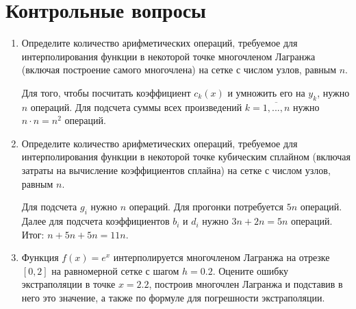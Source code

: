 \documentclass[12pt, a4paper]{article}
\begin{document}
\pagebreak

\section{Контрольные вопросы}
\begin{enumerate}

\item Определите количество арифметических операций, требуемое для интерполирования функции в некоторой точке многочленом Лагранжа (включая построение самого многочлена) на сетке с числом узлов, равным $n$.

Для того, чтобы посчитать коэффициент $c_k(x)$ и умножить его на $y_k$, нужно $n$ операций. Для подсчета суммы всех произведений $k = \overline{1,..., n}$ нужно $n \cdot n = n^2$ операций.

\item Определите количество арифметических операций, требуемое для интерполирования функции в некоторой точке кубическим сплайном (включая затраты на вычисление коэффициентов сплайна) на сетке с числом узлов, равным $n$.

Для подсчета $g_i$ нужно $n$ операций. Для прогонки потребуется $5n$ операций. Далее для подсчета коэффициентов $b_i$ и $d_i$ нужно $3n + 2n = 5n$ операций. Итог: $n + 5n + 5n = 11n$.

\pagebreak

\item Функция $f(x) = e^x$ интерполируется многочленом Лагранжа на отрезке $[0, 2]$ на равномерной сетке с шагом $h = 0{.}2$. Оцените ошибку экстраполяции в точке $x = 2{.}2$, построив многочлен Лагранжа и подставив в него это значение, а также по формуле для погрешности экстраполяции.


\end{enumerate}
\end{document}
